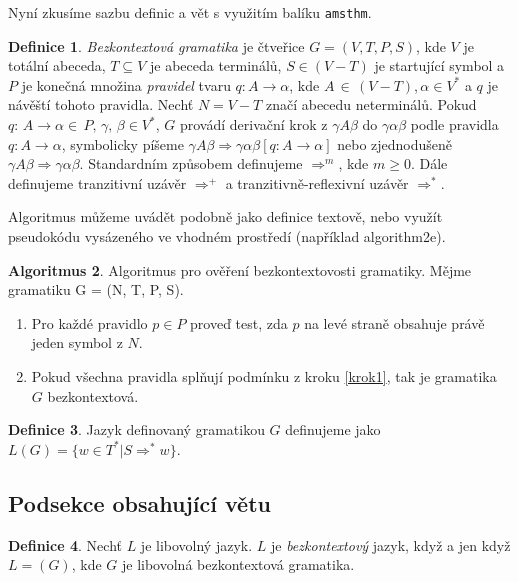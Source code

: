 \documentclass[11pt,a4paper,twocolumn]{article}
\theoremstyle{definition}
\newtheorem{defn}{Definice}[section]
\theoremstyle{lemma}
\newtheorem{algo}[defn]{Algoritmus}
\begin{document}
\indent Nyní zkusíme sazbu definic a vět s využitím balíku \texttt{amsthm}.
\begin{defn} 
  \label{defn1}
  \textit{Bezkontextová gramatika} je čtveřice $G = (V,T,P,S)$, kde $V$ je totální abeceda,
  $T\!\subseteq\!V$ je abeceda terminálů, $S\!\in\!(V-T)$ je startující symbol a $P$ je konečná
  množina \textit{pravidel} tvaru $q\!: A\!\rightarrow\alpha$, kde 
  $A\,\in\,(V-T)$,$\,\alpha\in\!V^*$ a $q$ je návěští tohoto pravidla. Nechť $N=V-T$ značí 
  abecedu neterminálů. Pokud $q\!:\,A\rightarrow\alpha\in\,P,\,\gamma,\,\beta\in\!V^*$, $G$ 
  provádí derivační krok z $\gamma A\beta$ do $\gamma\alpha\beta$ podle pravidla 
  $q\!: A \rightarrow \alpha$, symbolicky píšeme 
  $\gamma A\beta \Rightarrow \gamma\alpha\beta [q\!: A \rightarrow \alpha]$ nebo zjednodušeně
  $\gamma A\beta \Rightarrow \gamma\alpha\beta$. Standardním způsobem definujeme $\Rightarrow^m$,
  kde $m \geq 0$. Dále definujeme tranzitivní uzávěr $\Rightarrow^+$ a tranzitivně-reflexivní
  uzávěr $\Rightarrow^*$.
\end{defn}

Algoritmus můžeme uvádět podobně jako definice textově, nebo využít pseudokódu vysázeného ve vhodném prostředí (například algorithm2e).


\begin{algo} 
  \label{algo1}
  Algoritmus pro ověření bezkontextovosti gramatiky. Mějme gramatiku G = (N, T, P, S).
  \begin{enumerate}
    \item\label{krok1} Pro každé pravidlo $p\in P$ proveď test, zda $p$ na levé straně obsahuje
      právě jeden symbol z $N$.
    \item\label{krok2} Pokud všechna pravidla splňují podmínku z kroku \ref{krok1}, tak je
      gramatika $G$ bezkontextová.
  \end{enumerate}
\end{algo}

\begin{defn} 
  \label{defn2}
  Jazyk definovaný gramatikou $G$ definujeme jako $L(G)=\{w\in T^*|S\Rightarrow^*w\}$.
\end{defn}

\subsection{Podsekce obsahující větu}

\begin{defn} 
  \label{defn3}
  Nechť $L$ je libovolný jazyk. $L$ je {\itshape bezkontextový} jazyk, když a jen když $L=
  (G)$, kde $G$ je libovolná bezkontextová gramatika.
\end{defn}
\end{document}
